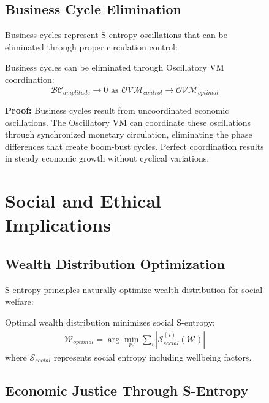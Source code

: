 \begin{figure}[h]
    \subsection{Business Cycle Elimination}
    
    Business cycles represent S-entropy oscillations that can be eliminated through proper circulation control:
    
    \begin{theorem}
    Business cycles can be eliminated through Oscillatory VM coordination:
    \begin{equation}
    \mathcal{BC}_{amplitude} \rightarrow 0 \text{ as } \mathcal{OVM}_{control} \rightarrow \mathcal{OVM}_{optimal}
    \end{equation}
    
    \textbf{Proof:}
    Business cycles result from uncoordinated economic oscillations. The Oscillatory VM can coordinate these oscillations through synchronized monetary circulation, eliminating the phase differences that create boom-bust cycles. Perfect coordination results in steady economic growth without cyclical variations.
    \end{theorem}
    
    \section{Social and Ethical Implications}
    
    \subsection{Wealth Distribution Optimization}
    
    S-entropy principles naturally optimize wealth distribution for social welfare:
    
    \begin{definition}
    Optimal wealth distribution minimizes social S-entropy:
    \begin{align}
    \mathcal{W}_{optimal} = \arg\min_{\mathcal{W}} \sum_{i} |\mathcal{S}_{social}^{(i)}(\mathcal{W})|
    \end{align}
    where $\mathcal{S}_{social}$ represents social entropy including wellbeing factors.
    \end{definition}
    
    \subsection{Economic Justice Through S-Entropy}
    

\end{figure}
